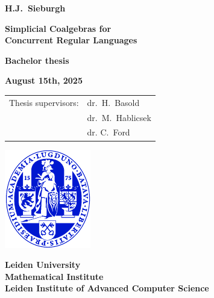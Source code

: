 \pagestyle{empty}

\vspace*{1em}

\begin{center}

{\Large\bf 
H.J.\ Sieburgh
} 

\vspace{1em} 

{\LARGE\bf 
Simplicial Coalgebras for
\\ \vspace{.25em} 
Concurrent Regular Languages
} 

\vspace{10em} 

{\large\bf 
Bachelor thesis
} 

\vspace{1em}

{\large\bf 
August 15th, 2025
}

\vspace{8em} 

{\large\bf
\begin{tabular}{ll}
Thesis supervisors: & dr.\ H.\ Basold\\
                            & dr.\ M.\ Hablicsek\\
                            & dr. C.\ Ford\\
\end{tabular}
}

\vfill

\includegraphics[width = 0.2\linewidth]{ulzegel_blauw.pdf}\\

\vspace{2em}

{\large\bf 
Leiden University\\
Mathematical Institute\\
Leiden Institute of Advanced Computer Science\\
}

\end{center} \newpage